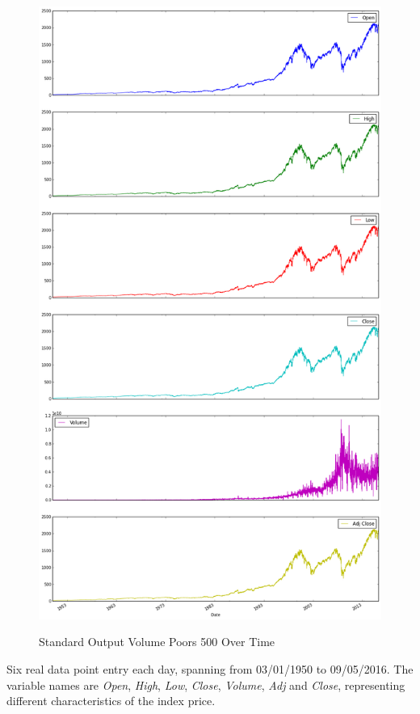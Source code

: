 \begin{figure}[bth]
  \myfloatalign
  {\includegraphics[width=1\linewidth]
    {gfx/standard-and-poors-500-over-time}}
  \caption{Standard Output Volume Poors 500
    Over Time}
  \label{fig:standard-and-poors-500-over-time}
\end{figure}

Six real data point entry each day, spanning from 03/01/1950 to
09/05/2016. The variable names are \textit{Open}, \textit{High},
\textit{Low}, \textit{Close}, \textit{Volume}, \textit{Adj} and
\textit{Close}, representing different characteristics of the index
price.

